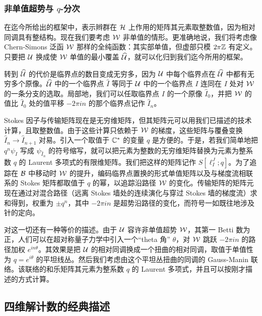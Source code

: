 \subsubsection{非单值超势与 $q$-分次}\label{nonsingle}

在迄今所给出的框架中，表示辫群在 ${\mathcal H}$ 上作用的矩阵其元素取整数值，因为相对同调具有整结构。现在我们要考虑 ${\mathcal W}$ 非单值的情形。更准确地说，我们将考虑像 Chern-Simons 泛函 ${\mathcal W}$ 那样的全纯函数：其实部单值，但虚部只模 $2 \pi {\mathbb Z}$ 有定义。只要把 ${\mathcal U}$ 换成使 ${\mathcal W}$ 单值的最小覆盖 $\widehat {{\mathcal U}}$，就可以化归到我们迄今所用的框架。

转到 $\widehat{{\mathcal U}}$ 的代价是临界点的数目变成无穷多，因为 ${\mathcal U}$ 中每个临界点在 $\widehat {{\mathcal U}}$ 中都有无穷多个原像。$\widehat {{\mathcal U}}$ 中的一个临界点 $\hat I$ 等同于 ${\mathcal U}$ 中的一个临界点 $I$ 连同在 $I$ 处对 ${\mathcal W}$ 的一条分支的选取。局部地，我们可以任取临界点 $I$ 的一个原像 $\hat I_0$，并把 ${\mathcal W}$ 的值比 $\hat I_0$ 处的值平移 $-2 \pi i n$ 的那个临界点记作 $\hat I_n$。

Stokes 因子与传输矩阵现在是无穷维矩阵，但其矩阵元可以用我们已描述的技术计算，且取整数值。由于这些计算只依赖于 ${\mathcal W}$ 的梯度，这些矩阵与覆叠变换 $\hat I_n \to \hat I_{n+1}$ 对易。引入一个取值于 ${\mathbb C}^*$ 的变量 $q$ 是方便的。于是，若我们简单地把 $q^n\psi_I$ 写成 $\psi_{\hat I_n}$ 的符号缩写，就可以把元素为整数的无穷维矩阵替换为元素为整系数 $q$ 的 Laurent 多项式的有限维矩阵。我们把这样的矩阵记作 $S[\ell_I^J;q]$。为了追踪在 $\mathcal{B}$ 中移动时 ${\mathcal W}$ 的提升，编码临界点置换的形式单值矩阵以及与梯度流相联系的 Stokes 矩阵都取值于 $q$ 的幂，以追踪沿路径 ${\mathcal W}$ 的变化。传输矩阵的矩阵元现在通过对混合路径（远离 Stokes 墙处的连续演化与穿过 Stokes 墙的梯度流）求和得到，权重为 $\pm q^n$，其中 $-2\pi i n$ 是超势沿路径的变化，而符号一如既往地涉及针的定向。

对这一切还有一种等价的描述。由于 ${\mathcal U}$ 容许非单值超势 ${\mathcal W}$，其第一 Betti 数为正，人们可以在超对称量子力学中引入一个“theta 角” $\theta$，对 ${\mathcal W}$ 跳跃 $-2\pi i n$ 的路径加权 $e^{in\theta}$。其效果是把 ${\mathcal U}$ 的相对同调换成一个扭曲的相对同调，取值于单值性为 $q=e^{i\theta}$ 的平坦线丛。然后我们考虑由这个平坦丛扭曲的同调的 Gauss-Manin 联络。该联络的和乐矩阵其元素为整系数 $q$ 的 Laurent 多项式，并且可以按刚才描述的方式计算。




\subsection{四维解计数的经典描述}\label{clco}

